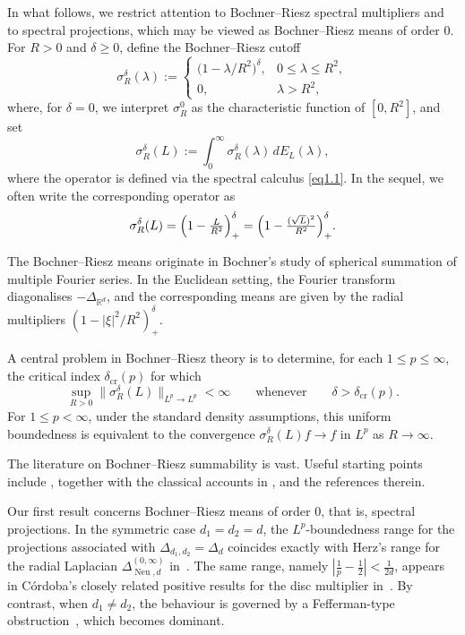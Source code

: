 \documentclass[12pt]{amsart}
\newcommand\Neu{\operatorname{Neu}}
\newcommand\LapoN{\Delta^{(0, \infty)}_{\Neu, d}}
\begin{document}
In what follows, we restrict attention to Bochner--Riesz spectral multipliers and
to spectral projections, which may be viewed as Bochner--Riesz means of order
$0$. For $R>0$ and $\delta\geq 0$, define the Bochner--Riesz cutoff
\[
\sigma_R^\delta(\lambda):=
\begin{cases}
\bigl(1-\lambda/R^2\bigr)^\delta, & 0\leq \lambda\leq R^2,\\[2mm]
0, & \lambda>R^2,
\end{cases}
\]
where, for $\delta=0$, we interpret $\sigma_R^0$ as the characteristic
function of $[0,R^2]$, and set
\begin{equation}\label{delBR}
\sigma_R^\delta(L):=
\int_{0}^{\infty}\sigma_R^\delta(\lambda)\,dE_L(\lambda),
\end{equation}
where the operator is defined via the spectral calculus \eqref{eq1.1}.
In the sequel, we often write the corresponding operator as
\[
\sigma_R^\delta(L)
=
\Bigl(1-\tfrac{L}{R^2}\Bigr)_+^\delta
=
\Bigl(1-\tfrac{(\sqrt{L})^2}{R^2}\Bigr)_+^\delta.
\]




The Bochner--Riesz means originate in Bochner's study
\cite{Bochner1936} of spherical summation of multiple Fourier series.
In the Euclidean setting, the Fourier transform diagonalises
\(-\Delta_{\mathbb R^d}\), and the corresponding means are given by the
radial multipliers
$\left(1-{|\xi|^2}/{R^2}\right)_+^\delta$.



A central problem in Bochner--Riesz theory is to determine, for each
\(1\leq p\leq\infty\), the critical index \(\delta_{\mathrm{cr}}(p)\) for which
\[
\sup_{R>0}\|\sigma_R^\delta(L)\|_{L^p\to L^p}<\infty
\qquad\text{whenever}\qquad
\delta>\delta_{\mathrm{cr}}(p).
\]
For \(1\leq p<\infty\), under the standard density assumptions, this uniform
boundedness is equivalent to the convergence
\(\sigma_R^\delta(L)f\to f\) in \(L^p\) as \(R\to\infty\).

The literature on Bochner--Riesz summability is vast. Useful starting points
include \cite{MiCh,chSo,CaS,TT,wang2025, LeeS}, together with the classical accounts
in \cite[Chapter
IX]{Stein},\cite[Chapter 5.2]{Sogge} and the references therein.




Our first result concerns Bochner--Riesz means of order \(0\), that is,
spectral projections. In the symmetric case \(d_1=d_2=d\), the
\(L^p\)-boundedness range for the projections associated with
\(\Delta_{d_1,d_2}=\Delta_d\) coincides exactly with Herz's range for the
radial Laplacian \(\LapoN\) in~\cite{Herz}. The same range, namely
\(\left|\frac{1}{p}-\frac{1}{2}\right|< \frac{1}{2d}\), appears in
C\'ordoba's closely related positive results for the disc multiplier
in~\cite{cord}. By contrast, when \(d_1\neq d_2\), the behaviour is
governed by a Fefferman-type obstruction~\cite{Fefferman}, which becomes
dominant.
\end{document}
